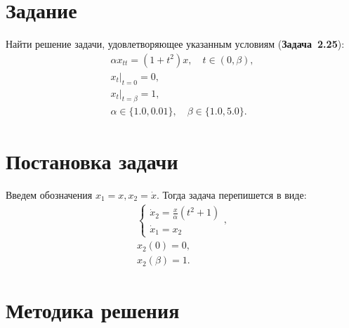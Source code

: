 \documentclass[a4paper,12pt]{article}
\newcommand{\UpdateMe}[1]{\textcolor{red}{#1}}
\newcommand{\University}{Московский государственный университет имени М.~В.~Ломоносова}
\newcommand{\Department}{Кафедра \UpdateMe{НАЗВАНИЕ-КАФЕДРЫ}}
\newcommand{\Student}{\UpdateMe{ИМЯ-СТУДЕНТА}}
\newcommand{\GroupNum}{\UpdateMe{НОМЕР}}
\newcommand{\Seminar}{\UpdateMe{НАЗВАНИЕ-ПРАКТИКУМА}}
\begin{document}

\section*{Задание}
Найти решение задачи, удовлетворяющее указанным условиям ({\bfseries Задача~2.25}):
\begin{gather*}
  \alpha x_{tt}=\left(1+t^2\right)x, \quad t\in(0, \beta),\\
  \left.x_{t}\right\vert_{t=0}=0,\\
  \left.x_{t}\right\vert_{t=\beta}=1,\\
  \alpha \in \{1.0, 0.01\}, \quad \beta \in \{1.0, 5.0\}.
\end{gather*}

\section*{Постановка задачи}

Введем обозначения \(x_1 = x, x_2=\dot{x}\). Тогда задача перепишется в виде:
\begin{gather}
  \label{common_system} \begin{cases}\dot{x}_2=\frac{x}{\alpha}\left(t^2+1\right)\\ \dot{x}_1=x_2 \end{cases},\\
  \label{left_conditions} x_2(0)=0,\\
  \label{right_conditions} x_2(\beta)=1.
\end{gather}

\section*{Методика решения}
\end{document}
